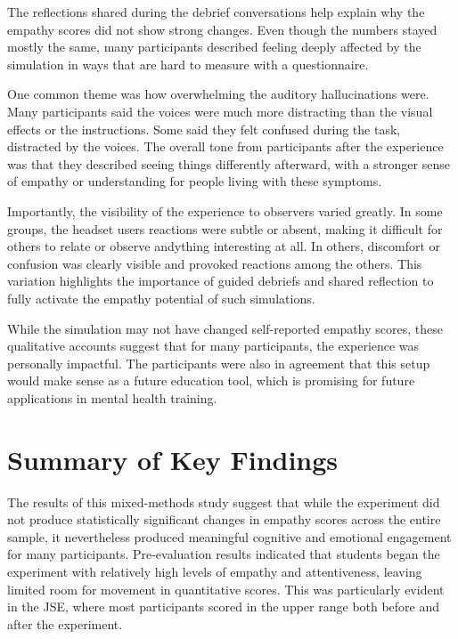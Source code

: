 The reflections shared during the debrief conversations help explain why the empathy scores did not show strong changes. Even though the numbers stayed mostly the same, many participants described feeling deeply affected by the simulation in ways that are hard to measure with a questionnaire.

One common theme was how overwhelming the auditory hallucinations were. Many participants said the voices were much more distracting than the visual effects or the instructions. Some said they felt confused during the task, distracted by the voices. The overall tone from participants after the experience was that they described seeing things differently afterward, with a stronger sense of empathy or understanding for people living with these symptoms.

\vspace{1em}

Importantly, the visibility of the experience to observers varied greatly. In some groups, the headset users reactions were subtle or absent, making it difficult for others to relate or observe andything interesting at all. In others, discomfort or confusion was clearly visible and provoked reactions among the others. This variation highlights the importance of guided debriefs and shared reflection to fully activate the empathy potential of such simulations.

While the simulation may not have changed self-reported empathy scores, these qualitative accounts suggest that for many participants, the experience was personally impactful. The participants were also in agreement that this setup would make sense as a future education tool, which is promising for future applications in mental health training.


\section{Summary of Key Findings}

The results of this mixed-methods study suggest that while the experiment did not produce statistically significant changes in empathy scores across the entire sample, it nevertheless produced meaningful cognitive and emotional engagement for many participants. Pre-evaluation results indicated that students began the experiment with relatively high levels of empathy and attentiveness, leaving limited room for  movement in quantitative scores. This was particularly evident in the JSE, where most participants scored in the upper range both before and after the experiment.

